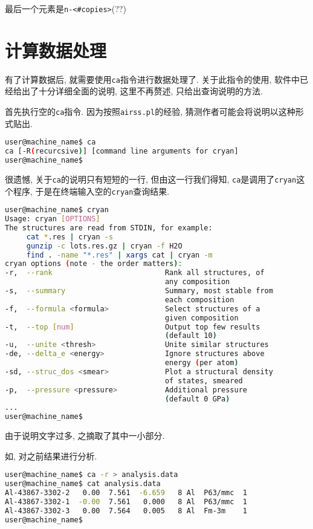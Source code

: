 \documentclass[a4paper, 10pt]{article}
\begin{document}
    最后一个元素是\verb|n-<#copies>|(??)

  \section{计算数据处理}
    有了计算数据后, 就需要使用\verb|ca|指令进行数据处理了. 关于此指令的使用, 软件中已经给出了十分详细全面的说明, 这里不再赘述, 只给出查询说明的方法. 
    
    首先执行空的\verb|ca|指令. 因为按照\verb|airss.pl|的经验, 猜测作者可能会将说明以这种形式贴出. 
    \begin{lstlisting}[language={bash}]
user@machine_name$ ca
ca [-R(recurcsive)] [command line arguments for cryan]
user@machine_name$
    \end{lstlisting}

    很遗憾, 关于\verb|ca|的说明只有短短的一行, 但由这一行我们得知, \verb|ca|是调用了\verb|cryan|这个程序, 于是在终端输入空的\verb|cryan|查询结果.
    \begin{lstlisting}[language={bash}]
user@machine_name$ cryan
Usage: cryan [OPTIONS]
The structures are read from STDIN, for example:
     cat *.res | cryan -s
     gunzip -c lots.res.gz | cryan -f H2O
     find . -name "*.res" | xargs cat | cryan -m
cryan options (note - the order matters):
-r,  --rank                          Rank all structures, of 
                                     any composition
-s,  --summary                       Summary, most stable from 
                                     each composition
-f,  --formula <formula>             Select structures of a 
                                     given composition
-t,  --top [num]                     Output top few results 
                                     (default 10)
-u,  --unite <thresh>                Unite similar structures
-de, --delta_e <energy>              Ignore structures above 
                                     energy (per atom)
-sd, --struc_dos <smear>             Plot a structural density 
                                     of states, smeared
-p,  --pressure <pressure>           Additional pressure 
                                     (default 0 GPa)
...
user@machine_name$
    \end{lstlisting}

    由于说明文字过多, 之摘取了其中一小部分.

    如, 对之前结果进行分析.
    \begin{lstlisting}[language={bash}]
user@machine_name$ ca -r > analysis.data
user@machine_name$ cat analysis.data
Al-43867-3302-2   0.00  7.561  -6.659   8 Al  P63/mmc  1
Al-43867-3302-1  -0.00  7.561   0.000   8 Al  P63/mmc  1
Al-43867-3302-3   0.00  7.564   0.005   8 Al  Fm-3m    1
user@machine_name$
    \end{lstlisting}
\end{document}
